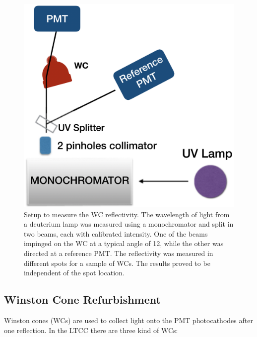 \begin{figure}[!h]
	\centering
	\includegraphics[width=0.8\columnwidth,keepaspectratio]{img/wcSetup.png}
	\caption{Setup to measure the WC reflectivity. The wavelength of light from a deuterium lamp was measured
          using a monochromator and split in two beams, each with calibrated intensity. One of the beams impinged on
          the WC at a typical angle of 12\mdeg, while the other was directed at a reference PMT. The reflectivity was
          measured in different spots for a sample of WCs. The results proved to be independent of the spot location.}
	\label{fig:wcSetup}
\end{figure}

\subsection{Winston Cone Refurbishment}

Winston cones (WCs) are used to collect light onto the PMT photocathodes after one reflection.
In the LTCC there are three kind of WCs:

